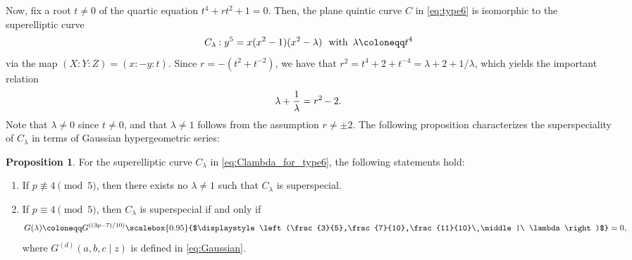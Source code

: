 \documentclass{article}
\theoremstyle{definition}
\newtheorem{Prop}[Def]{Proposition}
\begin{document}
\newpage
Now, fix a root $t \neq 0$ of the quartic equation $t^4+rt^2+1 = 0$.
Then, the plane quintic curve $C$ in \eqref{eq:type6} is isomorphic to the superelliptic curve\vspace{-1.3mm}
\begin{equation}\label{eq:Clambda_for_type6}
    C_\lambda\hspace{-0.2mm}: y^5 = x(x^2-1)(x^2-\lambda) \ \text{ with }\,\lambda \coloneqq t^4\vspace{0.4mm}
\end{equation}
via the map $(X:Y:Z) = (x:-y:t)$.
Since $r = -(t^2+t^{-2})$, we have that $r^2 = t^4+2+t^{-4} = \lambda+2+1/\lambda$, which yields the important relation\vspace{-0.2mm}
\begin{equation}\label{eq:lambda_for_type6}
    \lambda+\frac{1}{\lambda} = r^2\hspace{-0.3mm}-2.
\end{equation}
Note that $\lambda \neq 0$ since $t \neq 0$, and that $\lambda \neq 1$ follows from the assumption $r \neq \pm 2$.
The following proposition characterizes the superspeciality of $C_\lambda$ in terms of Gaussian hypergeometric series:\vspace{-1.2mm}
\begin{Prop}\label{prop:gauss_for_type6}
For the superelliptic curve $C_\lambda$ in \eqref{eq:Clambda_for_type6}, the following statements hold:\vspace{-1.6mm}
\begin{enumerate}
\item[(1)] If $p \not\equiv 4 \pmod{5}$, then there exists no $\lambda \neq 1$ such that $C_\lambda$ is superspecial.\vspace{-2.8mm}
\item[(2)] If $p \equiv 4 \pmod{5}$, then $C_\lambda$ is superspecial if and only if\vspace{-1.2mm}
\begin{equation}\label{eq:Glambda}
    G(\lambda) \coloneqq G^{((3p-7)/10)}\scalebox{0.95}{$\displaystyle\left(\frac{3}{5},\frac{7}{10},\frac{11}{10}\ \middle|\ \lambda\right)$} = 0,\vspace{-0.7mm}
\end{equation}
where $G^{(d)}(a,b,c \mid z)$ is defined in \eqref{eq:Gaussian}.\vspace{-0.6mm}
\end{enumerate}
\end{Prop}
\end{document}
